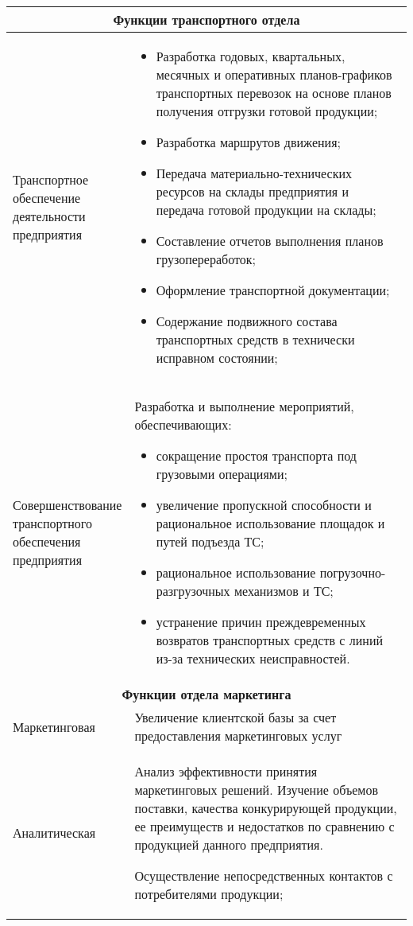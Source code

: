 \documentclass[a4paper,14pt]{extarticle}
\begin{document}
\begin{longtable}[h!]{|p{0.3\linewidth}|p{0.7\linewidth}|}
	\multicolumn{2}{|c|}{\textbf{Функции транспортного отдела}} \\ \hline
	Транспортное обеспечение деятельности предприятия & \begin{itemize}
		\item Разработка годовых, квартальных, месячных и оперативных планов-графиков транспортных перевозок на основе планов получения отгрузки готовой продукции;
		\item Разработка маршрутов движения;
		\item Передача материально-технических ресурсов на склады предприятия и передача готовой продукции на склады;
		\item Составление отчетов выполнения планов грузопереработок;
		\item Оформление транспортной документации;
		\item Содержание подвижного состава транспортных средств в технически исправном состоянии;
	\end{itemize} \\ \hline
	Совершенствование транспортного обеспечения предприятия & Разработка и выполнение мероприятий, обеспечивающих:
	\begin{itemize}
		\item сокращение простоя транспорта под грузовыми операциями;
		\item увеличение пропускной способности и рациональное использование площадок и путей подъезда ТС;
		\item рациональное использование погрузочно-разгрузочных механизмов и ТС;
		\item устранение причин преждевременных возвратов транспортных средств с линий из-за технических неисправностей.
	\end{itemize} \\ \hline

	\multicolumn{2}{|c|}{\textbf{Функции отдела маркетинга}} \\ \hline
	{Маркетинговая} & Увеличение клиентской базы за счет предоставления маркетинговых услуг \\ \hline
	Аналитическая & Анализ эффективности принятия маркетинговых решений. Изучение объемов поставки, качества конкурирующей продукции, ее преимуществ и недостатков по сравнению с продукцией данного предприятия.
	
	Осуществление непосредственных контактов с потребителями продукции;
\end{longtable}
\normalsize
\end{document}
